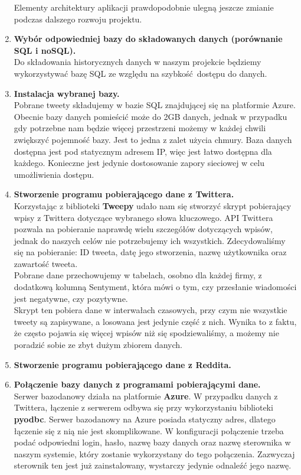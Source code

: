 \documentclass[a4paper,11pt, notitlepage ]{article}
\begin{document}
\begin{enumerate}
    Elementy architektury aplikacji prawdopodobnie ulegną jeszcze zmianie podczas dalszego rozwoju projektu.
    \item \textbf{Wybór odpowiedniej bazy do składowanych danych (porównanie SQL i noSQL).} \\
    Do składowania historycznych danych w naszym projekcie będziemy wykorzystywać bazę SQL ze względu na szybkość dostępu do danych.
    \item \textbf{Instalacja wybranej bazy.} \\
    Pobrane tweety składujemy w bazie SQL znajdującej się na platformie Azure. Obecnie bazy danych pomieścić może do 2GB danych, jednak w przypadku gdy potrzebne nam będzie więcej przestrzeni możemy w każdej chwili zwiększyć pojemność bazy. Jest to jedna z zalet użycia chmury. Baza danych dostępna jest pod statycznym adresem IP, więc jest łatwo dostępna dla każdego. Konieczne jest jedynie dostosowanie zapory sieciowej w celu umożliwienia dostępu.
    \item \textbf{Stworzenie programu pobierającego dane z Twittera.}\\
    Korzystając z biblioteki \textbf{Tweepy} udało nam się stworzyć skrypt pobierający wpisy z Twittera dotyczące wybranego słowa kluczowego. API Twittera pozwala na pobieranie naprawdę wielu szczegółów dotyczących wpisów, jednak do naszych celów nie potrzebujemy ich wszystkich. Zdecydowaliśmy się na pobieranie: ID tweeta, datę jego stworzenia, nazwę użytkownika oraz zawartość tweeta.\\
    Pobrane dane przechowujemy w tabelach, osobno dla każdej firmy, z dodatkową kolumną Sentyment, która mówi o tym, czy przesłanie wiadomości jest negatywne, czy pozytywne.\\
    Skrypt ten pobiera dane w interwałach czasowych, przy czym nie wszystkie tweety są zapisywane, a losowana jest jedynie część z nich. Wynika to z faktu, że często pojawia się więcej wpisów niż się spodziewaliśmy, a możemy nie poradzić sobie ze zbyt dużym zbiorem danych.
    \item \textbf{Stworzenie programu pobierającego dane z Reddita.}
    \item \textbf{Połączenie bazy danych z programami pobierającymi dane.}\\
    Serwer bazodanowy działa na platformie \textbf{Azure}. W przypadku danych z Twittera, łączenie z serwerem odbywa się przy wykorzystaniu biblioteki \textbf{pyodbc}. Serwer bazodanowy na Azure posiada statyczny adres, dlatego łączenie się z nią nie jest skomplikowane. W konfiguracji połączenie trzeba podać odpowiedni login, hasło, nazwę bazy danych oraz nazwę sterownika w naszym systemie, który zostanie wykorzystany do tego połączenia. Zazwyczaj sterownik ten jest już zainstalowany, wystarczy jedynie odnaleźć jego nazwę.

\end{enumerate}
\end{document}
